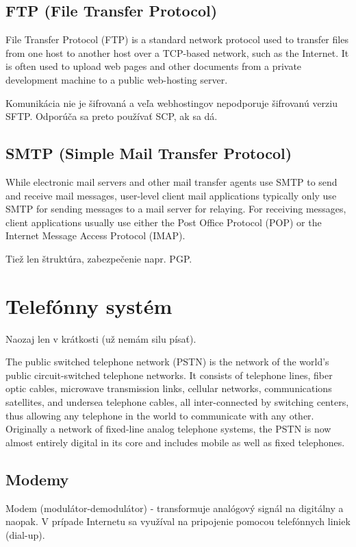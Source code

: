 \documentclass[10pt,a4paper]{article}
\begin{document}
\subsection{FTP (File Transfer Protocol)}  
File Transfer Protocol (FTP) is a standard network protocol used to transfer files from one host to another host over a TCP-based network, such as the Internet. It is often used to upload web pages and other documents from a private development machine to a public web-hosting server.

Komunikácia nie je šifrovaná a veľa webhostingov nepodporuje šifrovanú verziu SFTP. Odporúča sa preto používať SCP, ak sa dá.  
 
\subsection{SMTP (Simple Mail Transfer Protocol)}   
While electronic mail servers and other mail transfer agents use SMTP to send and receive mail messages, user-level client mail applications typically only use SMTP for sending messages to a mail server for relaying. For receiving messages, client applications usually use either the Post Office Protocol (POP) or the Internet Message Access Protocol (IMAP). 

Tiež len štruktúra, zabezpečenie napr. PGP. 


\section{Telefónny systém}  
Naozaj len v krátkosti (už nemám silu písať). 

The public switched telephone network (PSTN) is the network of the world's public circuit-switched telephone networks. It consists of telephone lines, fiber optic cables, microwave transmission links, cellular networks, communications satellites, and undersea telephone cables, all inter-connected by switching centers, thus allowing any telephone in the world to communicate with any other. Originally a network of fixed-line analog telephone systems, the PSTN is now almost entirely digital in its core and includes mobile as well as fixed telephones.
  
\subsection{Modemy}      
Modem (modulátor-demodulátor) - transformuje analógový signál na digitálny a naopak. V prípade Internetu sa využíval na pripojenie pomocou telefónnych liniek (dial-up).
\end{document}
